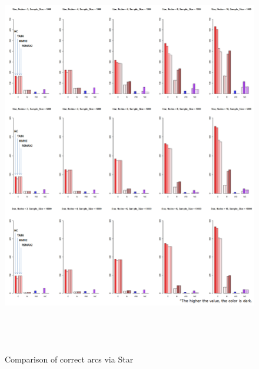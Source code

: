 	\begin{figure}[p]
	\centering
		\includegraphics[height=500pt]{images/03_Star_Arcs}
		\caption{Comparison of correct arcs via Star}
	\end{figure}	
